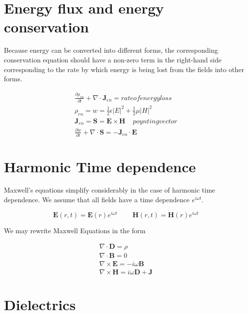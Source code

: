 \documentclass{article}
\begin{document}
	\section{Energy flux and energy conservation}

		Because energy can be converted into different forms, the corresponding conservation equation should have a non-zero term in the right-hand side corresponding to the rate by which energy is being lost from the fields into other forms.

		\begin{equation}
		\begin{aligned}
			\frac{\partial \rho_{en}}{\partial t} + \nabla\cdot\bm{J}_{en} = rate of energy loss\\
			\rho_{en} = w = \frac{1}{2}\epsilon|E|^{2} + \frac{1}{2}\mu|H|^{2}\\
			\bm{J}_{en} = \bm{S} = \bm{E \times H} \ \ \ \ \ poynting vector\\
			\frac{\partial w}{\partial t} + \nabla\cdot\bm{S} = -\bm{J}_{en}\cdot\bm{E}
		\end{aligned}
		\end{equation}

	\section{Harmonic Time dependence}

		Maxwell’s equations simplify considerably in the case of harmonic time dependence. We assume that all fields have a time dependence $e^{i\omega t}$.

		$$\bm{E}(r,t) = \bm{E}(r)e^{i\omega t}\ \ \ \ \ \ \ \ \ \ \bm{H}(r,t) = \bm{H}(r)e^{i\omega t}$$

		We may rewrite Maxwell Equations in the form

		\begin{equation}
		\begin{aligned}
			\nabla\cdot\bm{D} = \rho\\
			\nabla\cdot\bm{B} = 0\\
			\nabla\times\bm{E} = -i\omega\bm{B}\\
			\nabla\times\bm{H} = i\omega\bm{D} + \bm{J}
		\end{aligned}
		\end{equation}

	\section{Dielectrics}
\end{document}
